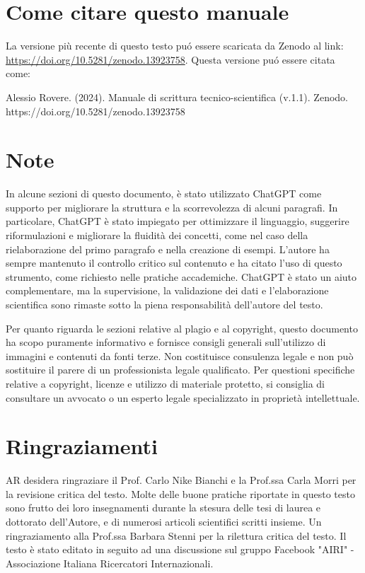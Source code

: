 \documentclass[9pt,a4paper,twoside]{rho-class/rho}
\begin{document}
\section*{Come citare questo manuale}
La versione più recente di questo testo puó essere scaricata da Zenodo al link: \url{https://doi.org/10.5281/zenodo.13923758}.
Questa versione puó essere citata come:

Alessio Rovere. (2024). Manuale di scrittura tecnico-scientifica (v.1.1). Zenodo. https://doi.org/10.5281/zenodo.13923758

\section*{Note}
In alcune sezioni di questo documento, è stato utilizzato ChatGPT come supporto per migliorare la struttura e la scorrevolezza di alcuni paragrafi. In particolare, ChatGPT è stato impiegato per ottimizzare il linguaggio, suggerire riformulazioni e migliorare la fluidità dei concetti, come nel caso della rielaborazione del primo paragrafo e nella creazione di esempi. L'autore ha sempre mantenuto il controllo critico sul contenuto e ha citato l’uso di questo strumento, come richiesto nelle pratiche accademiche. ChatGPT è stato un aiuto complementare, ma la supervisione, la validazione dei dati e l’elaborazione scientifica sono rimaste sotto la piena responsabilità dell'autore del testo.

Per quanto riguarda le sezioni relative al plagio e al copyright, questo documento ha scopo puramente informativo e fornisce consigli generali sull’utilizzo di immagini e contenuti da fonti terze. Non costituisce consulenza legale e non può sostituire il parere di un professionista legale qualificato. Per questioni specifiche relative a copyright, licenze e utilizzo di materiale protetto, si consiglia di consultare un avvocato o un esperto legale specializzato in proprietà intellettuale.

\section*{Ringraziamenti}
AR desidera ringraziare il Prof. Carlo Nike Bianchi e la Prof.ssa Carla Morri per la revisione critica del testo. Molte delle buone pratiche riportate in questo testo sono frutto dei loro insegnamenti durante la stesura delle tesi di laurea e dottorato dell'Autore, e di numerosi articoli scientifici scritti insieme. Un ringraziamento alla Prof.ssa Barbara Stenni per la rilettura critica del testo. Il testo è stato editato in seguito ad una discussione sul gruppo Facebook "AIRI" -Associazione Italiana Ricercatori Internazionali.



\printbibliography
\end{document}
